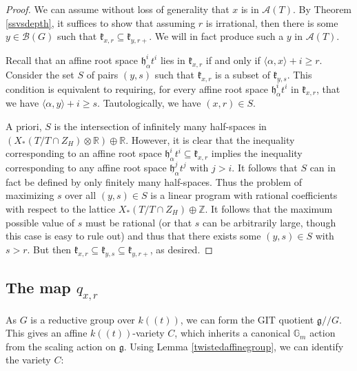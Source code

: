 \documentclass[12pt]{article}
\theoremstyle{remark}
\begin{document}
\begin{proof}
We can assume without loss of generality that $x$ is in $\mathcal{A}(T)$. By Theorem \ref{ssvsdepth}, it suffices to show that assuming $r$ is irrational, then there is some $y\in\mathcal{B}(G)$ such that $\mathfrak{k}_{x,r}\subseteq\mathfrak{k}_{y,r+}.$ We will in fact produce such a $y$ in $\mathcal{A}(T)$.

Recall that an affine root space $\mathfrak{h}_{\alpha}^it^i$ lies in $\mathfrak{k}_{x,r}$ if and only if $\langle\alpha,x\rangle+i\geq r.$ Consider the set $S$ of pairs $(y,s)$ such that $\mathfrak{k}_{x,r}$ is a subset of $\mathfrak{k}_{y,s}.$ This condition is equivalent to requiring, for every affine root space $\mathfrak{h}_{\alpha}^it^i$ in $\mathfrak{k}_{x,r}$, that we have $\langle\alpha,y\rangle+i\geq s.$ Tautologically, we have $(x,r)\in S$.

A priori, $S$ is the intersection of infinitely many half-spaces in $(X_*(T/T\cap Z_H)\otimes\mathbb{R})\oplus\mathbb{R}$. However, it is clear that the inequality corresponding to an affine root space $\mathfrak{h}_{\alpha}^it^i\subseteq\mathfrak{k}_{x,r}$ implies the inequality corresponding to any affine root space $\mathfrak{h}_{\alpha}^jt^j$ with $j>i.$ It follows that $S$ can in fact be defined by only finitely many half-spaces. Thus the problem of maximizing $s$ over all $(y,s)\in S$ is a linear program with rational coefficients with respect to the lattice $X_*(T/T\cap Z_H)\oplus\mathbb{Z}$. It follows that the maximum possible value of $s$ must be rational (or that $s$ can be arbitrarily large, though this case is easy to rule out) and thus that there exists some $(y,s)\in S$ with $s > r$. But then $\mathfrak{k}_{x,r}\subseteq\mathfrak{k}_{y,s}\subseteq\mathfrak{k}_{y,r+}$, as desired.

\end{proof}

\subsection{The map $q_{x,r}$}

As $G$ is a reductive group over $k((t))$, we can form the GIT quotient $\mathfrak{g}//G$. This gives an affine $k((t))$-variety $C$, which inherits a canonical $\mathbb{G}_m$ action from the scaling action on $\mathfrak{g}$. Using Lemma \ref{twistedaffinegroup}, we can identify the variety $C$:
\end{document}
